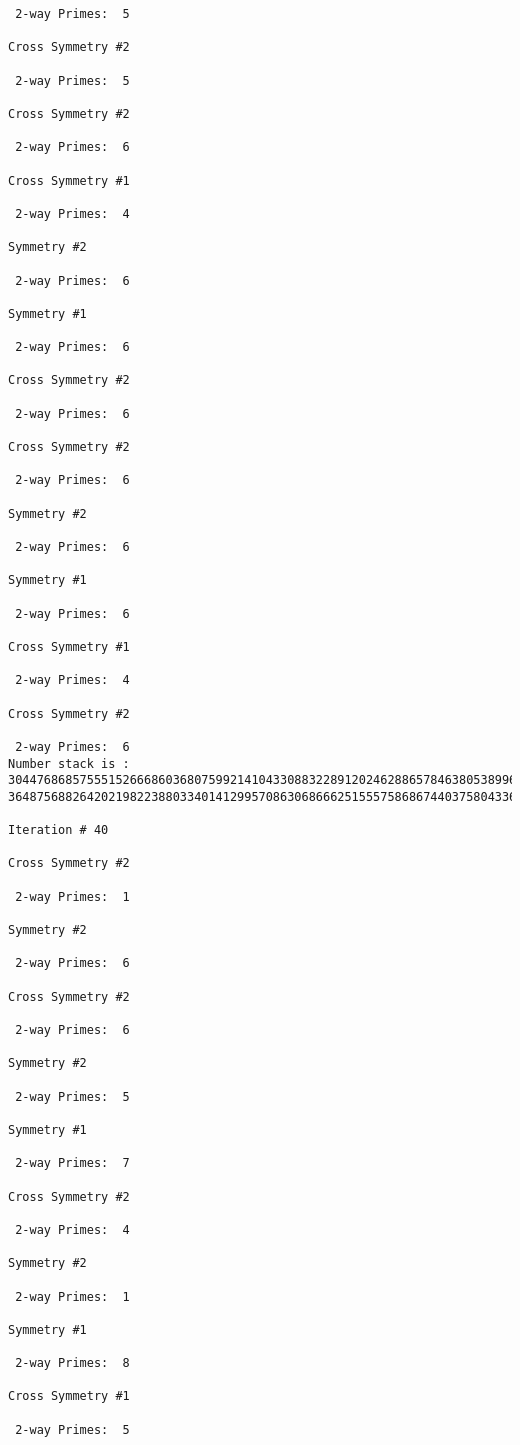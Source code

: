 {{{{\begin{verbatim}
 2-way Primes: 	5

Cross Symmetry #2

 2-way Primes: 	5

Cross Symmetry #2

 2-way Primes: 	6

Cross Symmetry #1

 2-way Primes: 	4

Symmetry #2

 2-way Primes: 	6

Symmetry #1

 2-way Primes: 	6

Cross Symmetry #2

 2-way Primes: 	6

Cross Symmetry #2

 2-way Primes: 	6

Symmetry #2

 2-way Primes: 	6

Symmetry #1

 2-way Primes: 	6

Cross Symmetry #1

 2-way Primes: 	4

Cross Symmetry #2

 2-way Primes: 	6
Number stack is :
30447686857555152666860368075992141043308832289120246288657846380538996794608835958544046240163340857
36487568826420219822388033401412995708630686662515557586867440375804336104264044585953880649769983508

Iteration #	40

Cross Symmetry #2

 2-way Primes: 	1

Symmetry #2

 2-way Primes: 	6

Cross Symmetry #2

 2-way Primes: 	6

Symmetry #2

 2-way Primes: 	5

Symmetry #1

 2-way Primes: 	7

Cross Symmetry #2

 2-way Primes: 	4

Symmetry #2

 2-way Primes: 	1

Symmetry #1

 2-way Primes: 	8

Cross Symmetry #1

 2-way Primes: 	5


\end{verbatim}}}}}

